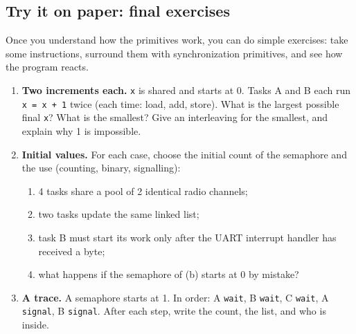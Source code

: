 \subsection{Try it on paper: final exercises}
Once you understand how the primitives work, you can do simple exercises: take some instructions, surround them with synchronization primitives, and see how the program reacts.
\begin{enumerate}
    \item \textbf{Two increments each.} \texttt{x} is shared and starts at 0. Tasks A and B each run \texttt{x = x + 1} twice (each time: load, add, store). What is the largest possible final \texttt{x}? What is the smallest? Give an interleaving for the smallest, and explain why 1 is impossible.
    \item \textbf{Initial values.} For each case, choose the initial count of the semaphore and the use (counting, binary, signalling):
    \begin{enumerate}
        \item 4 tasks share a pool of 2 identical radio channels;
        \item two tasks update the same linked list;
        \item task B must start its work only after the UART interrupt handler has received a byte;
        \item what happens if the semaphore of (b) starts at 0 by mistake?
    \end{enumerate}
    \item \textbf{A trace.} A semaphore starts at 1. In order: A \texttt{wait}, B \texttt{wait}, C \texttt{wait}, A \texttt{signal}, B \texttt{signal}. After each step, write the count, the list, and who is inside.
\end{enumerate}

